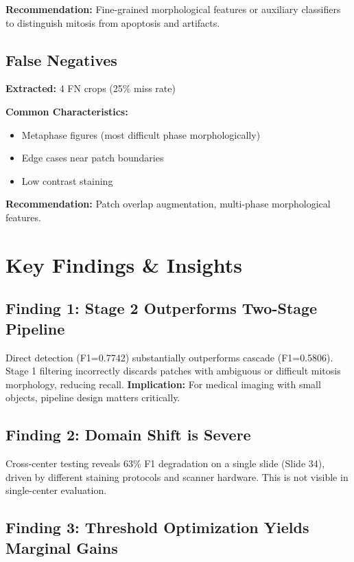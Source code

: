 \documentclass[11pt,a4paper]{article}
\begin{document}
\textbf{Recommendation:} Fine-grained morphological features or auxiliary classifiers 
to distinguish mitosis from apoptosis and artifacts.

\subsection{False Negatives}

\textbf{Extracted:} 4 FN crops (25\% miss rate)

\textbf{Common Characteristics:}
\begin{itemize}
    \item Metaphase figures (most difficult phase morphologically)
    \item Edge cases near patch boundaries
    \item Low contrast staining
\end{itemize}

\textbf{Recommendation:} Patch overlap augmentation, multi-phase morphological features.

\section{Key Findings \& Insights}

\subsection{Finding 1: Stage 2 Outperforms Two-Stage Pipeline}

Direct detection (F1=0.7742) substantially outperforms cascade 
(F1=0.5806). Stage 1 filtering incorrectly discards patches with 
ambiguous or difficult mitosis morphology, reducing recall. 
\textbf{Implication:} For medical imaging with small objects, 
pipeline design matters critically.

\subsection{Finding 2: Domain Shift is Severe}

Cross-center testing reveals 63\% F1 degradation on a single 
slide (Slide 34), driven by different staining protocols and 
scanner hardware. This is not visible in single-center evaluation.

\subsection{Finding 3: Threshold Optimization Yields Marginal Gains}
\end{document}
